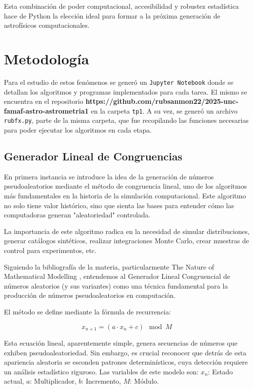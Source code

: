 \documentclass[baaa]{baaa}
\begin{document}
Esta combinación de poder computacional, accesibilidad y robustez estadística hace de Python la elección ideal para formar a la próxima generación de astrofísicos computacionales.

\section{Metodología}

Para el estudio de estos fenómenos se generó un \texttt{Jupyter Notebook} donde se detallan los algoritmos y programas implementados para cada tarea. El mismo se encuentra en el repositorio \textbf{https://github.com/rubsanmon22/2025-unc-famaf-astro-astrometria1} en la carpeta \texttt{tp1}. A su vez, se generó un archivo \texttt{rubfx.py}, parte de la misma carpeta, que fue recopilando las funciones necesarias para poder ejecutar los algoritmos en cada etapa.

\subsection{Generador Lineal de Congruencias}

En primera instancia se introduce la idea de la generación de números pseudoaleatorios mediante el método de congruencia lineal, uno de los algoritmos más fundamentales en la historia de la simulación computacional. Este algoritmo no solo tiene valor histórico, sino que sienta las bases para entender cómo las computadoras generan "aleatoriedad" controlada.

La importancia de este algoritmo radica en la necesidad de simular distribuciones, generar catálogos sintéticos, realizar integraciones Monte Carlo, crear muestras de control para experimentos, etc.

Siguiendo la bibliografía de la materia, particularmente The Nature of Mathematical Modelling \citep{gershenfeld1998nature}, entendemos al Generador Lineal Congruencial de números aleatorios (y sus variantes) como una técnica fundamental para la producción de números pseudoaleatorios en computación.

El método se define mediante la fórmula de recurrencia:

\begin{equation}
    x_{n+1} = (a \cdot x_n + c) \mod M
\end{equation}

Esta ecuación lineal, aparentemente simple, genera secuencias de números que exhiben pseudoaleatoriedad. Sin embargo, es crucial reconocer que detrás de esta apariencia aleatoria se esconden patrones determinísticos, cuya detección requiere un análisis estadístico riguroso. Las variables de este modelo son: \textbf{$x_n$}: Estado actual, \textbf{$a$}: Multiplicador, \textbf{$b$}: Incremento, \textbf{$M$}: Módulo.
\end{document}
